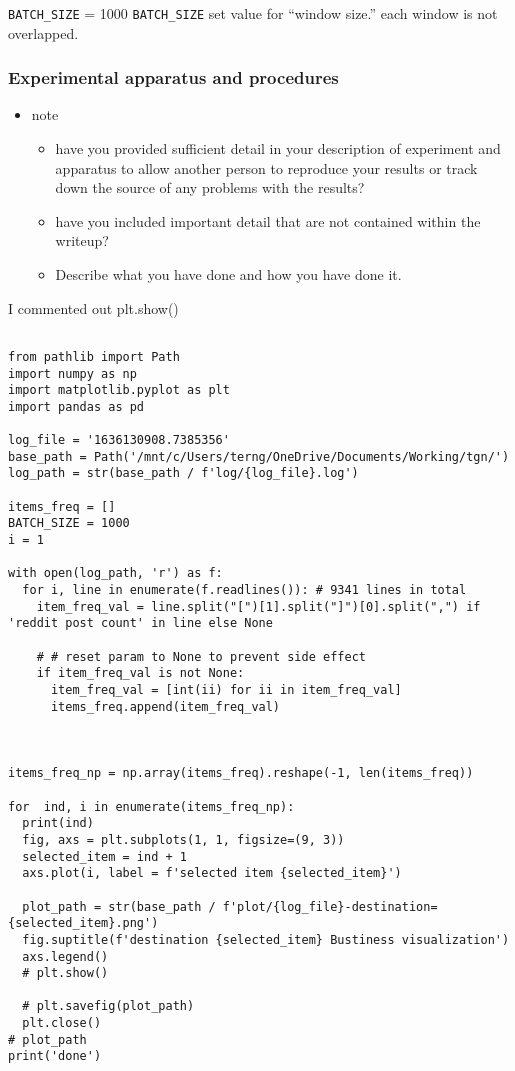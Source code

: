 \documentclass[11pt]{article}
\begin{document}
\texttt{BATCH\_SIZE} = 1000
\texttt{BATCH\_SIZE} set value for ``window size.''
each window is not overlapped.

\subsubsection{Experimental apparatus and procedures}
\label{sec:org950e55a}
\begin{itemize}
\item note
\begin{itemize}
\item have you provided sufficient detail in your description of experiment and apparatus to allow another person to reproduce your results or track down the source of any problems with the results?
\item have you included important detail that are not contained within the writeup?
\item Describe what you have done and how you have done it.
\end{itemize}
\end{itemize}

I commented out plt.show()
\begin{verbatim}

from pathlib import Path
import numpy as np
import matplotlib.pyplot as plt
import pandas as pd

log_file = '1636130908.7385356'
base_path = Path('/mnt/c/Users/terng/OneDrive/Documents/Working/tgn/')
log_path = str(base_path / f'log/{log_file}.log')

items_freq = []
BATCH_SIZE = 1000
i = 1

with open(log_path, 'r') as f:
  for i, line in enumerate(f.readlines()): # 9341 lines in total
    item_freq_val = line.split("[")[1].split("]")[0].split(",") if 'reddit post count' in line else None

    # # reset param to None to prevent side effect
    if item_freq_val is not None:
      item_freq_val = [int(ii) for ii in item_freq_val]
      items_freq.append(item_freq_val)



items_freq_np = np.array(items_freq).reshape(-1, len(items_freq))

for  ind, i in enumerate(items_freq_np):
  print(ind)
  fig, axs = plt.subplots(1, 1, figsize=(9, 3))
  selected_item = ind + 1
  axs.plot(i, label = f'selected item {selected_item}')

  plot_path = str(base_path / f'plot/{log_file}-destination={selected_item}.png')
  fig.suptitle(f'destination {selected_item} Bustiness visualization')
  axs.legend()
  # plt.show()

  # plt.savefig(plot_path)
  plt.close()
# plot_path
print('done')
\end{verbatim}
\end{document}
